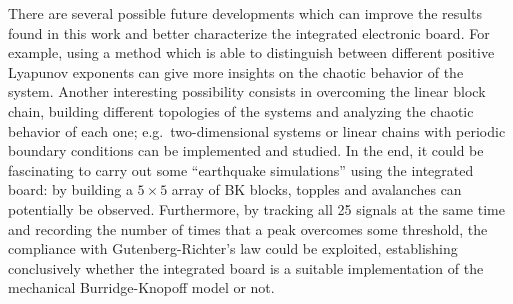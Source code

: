 
There are several possible future developments which can improve the results found in this work and
better characterize the integrated electronic board. For example, using a method which is able to
distinguish between different positive Lyapunov exponents can give more insights on the chaotic behavior
of the system. Another interesting possibility consists in overcoming the linear block chain, building
different topologies of the systems and analyzing the chaotic behavior of each one; e.g.\ two-dimensional
systems or linear chains with periodic boundary conditions can be implemented and studied. In the end,
it could be fascinating to carry out some ``earthquake simulations'' using the integrated board:
by building a $5\times5$ array of BK blocks, topples and avalanches can potentially be observed.
Furthermore, by tracking all 25 signals at the same time and recording the number of times that
a peak overcomes some threshold, the compliance with Gutenberg-Richter's law could be exploited,
establishing conclusively whether the integrated board is a suitable implementation of the mechanical
Burridge-Knopoff model or not.










